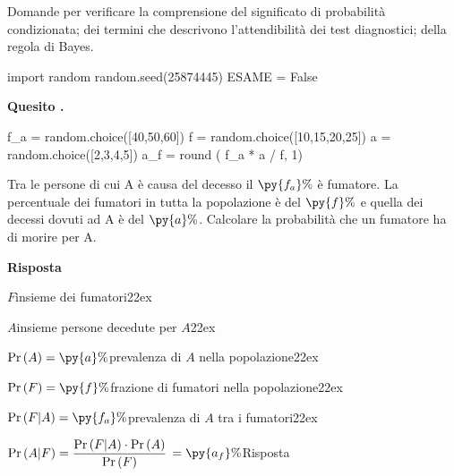 \documentclass[11pt,twoside,a4paper]{article}
\def\Pr{{\rm Pr\,}}
\newcounter{quesito}
\newenvironment{question}{\bigskip\addtocounter{quesito}{1}\par\textbf{Quesito \thequesito.}}{\vspace{\parskip}}
\newenvironment{answer}{\par\textbf{Risposta\quad}}{\vspace{\parskip}}
\begin{document}
\colorbox{blue!10}{\begin{minipage}{\textwidth}
Domande per verificare la comprensione del significato di probabilità condizionata; dei termini che descrivono l'attendibilità dei test diagnostici; della regola di Bayes.
\end{minipage}}

\bigskip\bigskip

\begin{pycode}
import random
random.seed(25874445)
ESAME = False
\end{pycode}

\begin{question}
\def\Pr{{\rm Pr\,}}
\begin{pycode}
f_a = random.choice([40,50,60])
f = random.choice([10,15,20,25])
a = random.choice([2,3,4,5])
a_f = round ( f_a * a / f, 1)
\end{pycode}
Tra le persone di cui A è causa del decesso il $\py{f_a}\%$ è fumatore. La percentuale dei fumatori in tutta la popolazione è del $\py{f}\%$ e quella dei decessi dovuti ad A è del $\py{a}\%$. Calcolare la probabilità che un fumatore ha di morire per A.
\begin{answer}

$F$\hfill insieme dei fumatori\kern22ex

$A$\hfill insieme persone decedute per $A$\kern22ex

$\Pr(A)=\py{a}\%$\hfill prevalenza di $A$ nella popolazione\kern22ex

$\Pr(F)=\py{f}\%$\hfill frazione di fumatori nella popolazione\kern22ex

$\Pr(F|A)=\py{f_a}\%$\hfill prevalenza di $A$ tra i fumatori\kern22ex

$\Pr(A|F)=\dfrac{\Pr(F|A)\cdot \Pr(A)}{\Pr(F)}$ {\color{blue}$=\py{a_f}\%$\hfill Risposta}
\end{answer}
\end{question}
\end{document}

